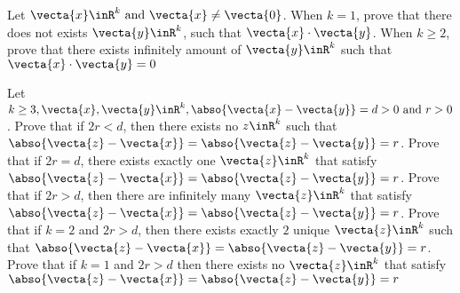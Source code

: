\documentclass{report}
\begin{document}
\begin{question}{}{}
Let $\vecta{x}\inR^k\text{ and }\vecta{x}\neq \vecta{0}$. When $k=1$,  prove that there does not exists $\vecta{y}\inR^k$, such that $\vecta{x}\cdot\vecta{y}$. When $k\geq 2$, prove that there exists infinitely amount of $\vecta{y}\inR^k$ such that $\vecta{x}\cdot\vecta{y}=0$ 

\end{question}
\begin{question}{}{}
Let $k\geq 3, \vecta{x},\vecta{y}\inR^k,\abso{\vecta{x}-\vecta{y}}=d>0\text{ and }r>0$. Prove that if $2r<d$, then there exists no  $z\inR^k$ such that $\abso{\vecta{z}-\vecta{x}}=\abso{\vecta{z}-\vecta{y}}=r$. Prove that if $2r=d$, there exists exactly one $\vecta{z}\inR^k$ that satisfy $\abso{\vecta{z}-\vecta{x}}=\abso{\vecta{z}-\vecta{y}}=r$. Prove that if $2r>d$, then there are infinitely many $\vecta{z}\inR^k$ that satisfy $\abso{\vecta{z}-\vecta{x}}=\abso{\vecta{z}-\vecta{y}}=r$. Prove that if $k=2$ and  $2r>d$, then there exists exactly $2$ unique  $\vecta{z}\inR^k$ such that $\abso{\vecta{z}-\vecta{x}}=\abso{\vecta{z}-\vecta{y}}=r$. Prove that if $k=1$ and $2r>d$ then there exists no $\vecta{z}\inR^k$ that satisfy $\abso{\vecta{z}-\vecta{x}}=\abso{\vecta{z}-\vecta{y}}=r$
\end{question}
\end{document}
